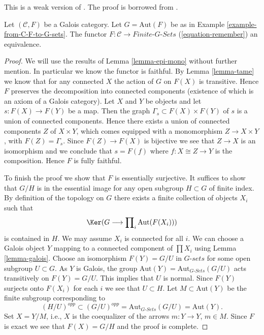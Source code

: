 \begin{proposition}
\label{proposition-galois}
\begin{reference}
This is a weak version of \cite[Expos\'e V]{SGA1}.
The proof is borrowed from \cite[Theorem 7.2.5]{BS}.
\end{reference}
Let $(\mathcal{C}, F)$ be a Galois category. Let $G = \text{Aut}(F)$
be as in Example \ref{example-from-C-F-to-G-sets}. The functor
$F : \mathcal{C} \to \textit{Finite-}G\textit{-Sets}$
(\ref{equation-remember}) an equivalence.
\end{proposition}

\begin{proof}
We will use the results of Lemma \ref{lemma-epi-mono} without further mention.
In particular we know the functor is faithful.
By Lemma \ref{lemma-tame} we know that for any connected $X$ the
action of $G$ on $F(X)$ is transitive. Hence $F$ preserves
the decomposition into connected components (existence of which is
an axiom of a Galois category). Let $X$ and $Y$ be objects and let
$s : F(X) \to F(Y)$ be a map. Then the graph
$\Gamma_s \subset F(X) \times F(Y)$ of $s$
is a union of connected components. Hence there exists a
union of connected components $Z$ of $X \times Y$,
which comes equipped with a monomorphism $Z \to X \times Y$,
with $F(Z) = \Gamma_s$. Since $F(Z) \to F(X)$ is bijective
we see that $Z \to X$ is an isomorphism and we conclude
that $s = F(f)$ where $f : X \cong Z \to Y$ is the composition.
Hence $F$ is fully faithful.

\medskip\noindent
To finish the proof we show that $F$ is essentially surjective.
It suffices to show that $G/H$ is in the essential image for
any open subgroup $H \subset G$ of finite index.
By definition of the topology on $G$ there exists a finite
collection of objects $X_i$ such that
$$
\Ker(G \longrightarrow \prod\nolimits_i \text{Aut}(F(X_i)))
$$
is contained in $H$. We may assume $X_i$ is connected
for all $i$. We can choose a Galois object $Y$ mapping
to a connected component of $\prod X_i$ using
Lemma \ref{lemma-galois}. Choose an isomorphism $F(Y) = G/U$
in $G\textit{-sets}$ for some open subgroup $U \subset G$.
As $Y$ is Galois, the group
$\text{Aut}(Y) = \text{Aut}_{G\textit{-Sets}}(G/U)$ acts transitively
on $F(Y) = G/U$. This implies that $U$ is normal. Since
$F(Y)$ surjects onto $F(X_i)$ for each $i$ we see that
$U \subset H$. Let $M \subset \text{Aut}(Y)$ be the finite subgroup
corresponding to
$$
(H/U)^{opp} \subset (G/U)^{opp} = \text{Aut}_{G\textit{-Sets}}(G/U)
= \text{Aut}(Y).
$$
Set $X = Y/M$, i.e., $X$ is the coequalizer
of the arrows $m : Y \to Y$, $m \in M$.
Since $F$ is exact we see that $F(X) = G/H$ and the
proof is complete.
\end{proof}

